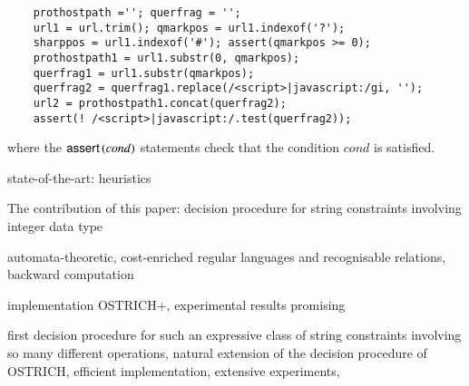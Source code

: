 {\small
\begin{verbatim}
    prothostpath =''; querfrag = '';
    url1 = url.trim(); qmarkpos = url1.indexof('?');
    sharppos = url1.indexof('#'); assert(qmarkpos >= 0); 
    prothostpath1 = url1.substr(0, qmarkpos);
    querfrag1 = url1.substr(qmarkpos);
    querfrag2 = querfrag1.replace(/<script>|javascript:/gi, '');
    url2 = prothostpath1.concat(querfrag2);
    assert(! /<script>|javascript:/.test(querfrag2));
\end{verbatim}
}
where the $\textsf{assert}\left(cond\right)$ statements check that the condition $cond$ is satisfied.


state-of-the-art: heuristics

The contribution of this paper: decision procedure for string constraints involving integer data type

automata-theoretic, cost-enriched regular languages and recognisable relations, backward computation

implementation OSTRICH+, experimental results promising

first decision procedure for such an expressive class of string constraints involving so many different operations, natural extension of the decision procedure of OSTRICH, efficient implementation, extensive experiments, 



